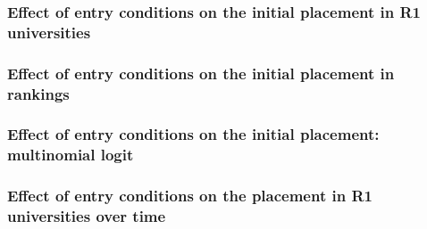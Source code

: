 \documentclass[11pt]{beamer}
\begin{document}
{
	\begin{frame}
		\frametitle{Effect of entry conditions on the initial placement in R1 universities}
		
	\end{frame}
}

{
	\begin{frame}
		\frametitle{Effect of entry conditions on the initial placement in rankings}
		
	\end{frame}
}

{
	\begin{frame}
		\frametitle{Effect of entry conditions on the initial placement: multinomial logit}
		
	\end{frame}
}



%
%		
%
{
	\begin{frame}
		\frametitle{Effect of entry conditions on the placement in R1 universities over time}
		
	\end{frame}
}
\end{document}
